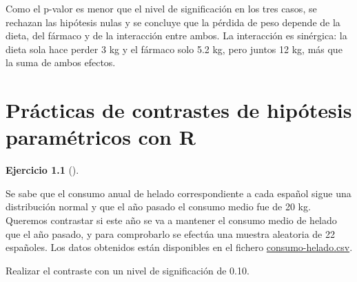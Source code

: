 \documentclass[
  spanish,
  a4paper,
]{scrreport}
\theoremstyle{definition}
\newtheorem{exercise}{Ejercicio}[chapter]
\theoremstyle{remark}
\begin{document}
\begin{tcolorbox}
Como el p-valor es menor que el nivel de significación en los tres
casos, se rechazan las hipótesis nulas y se concluye que la pérdida de
peso depende de la dieta, del fármaco y de la interacción entre ambos.
La interacción es sinérgica: la dieta sola hace perder 3 kg y el fármaco
solo 5.2 kg, pero juntos 12 kg, más que la suma de ambos efectos.

\end{tcolorbox}


\chapter{Prácticas de contrastes de hipótesis paramétricos con
R}\label{pruxe1cticas-de-contrastes-de-hipuxf3tesis-paramuxe9tricos-con-r}

\begin{exercise}[]\protect\hypertarget{exr-contraste-media-consumo}{}\label{exr-contraste-media-consumo}

Se sabe que el consumo anual de helado correspondiente a cada español
sigue una distribución normal y que el año pasado el consumo medio fue
de 20 kg. Queremos contrastar si este año se va a mantener el consumo
medio de helado que el año pasado, y para comprobarlo se efectúa una
muestra aleatoria de 22 españoles. Los datos obtenidos están disponibles
en el fichero \href{datos/consumo-helado.csv}{consumo-helado.csv}.

Realizar el contraste con un nivel de significación de 0.10.

\end{exercise}
\end{document}
